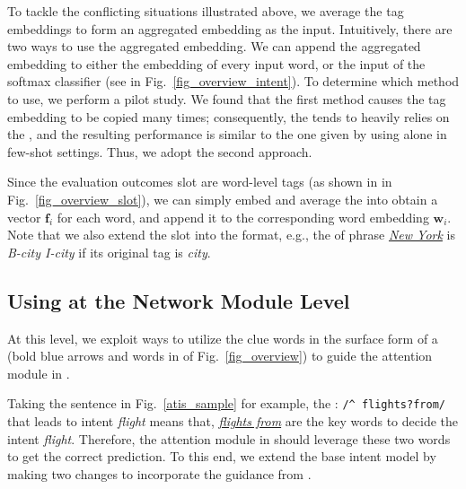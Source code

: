 To tackle the conflicting situations illustrated above, we average the tag embeddings to form an aggregated embedding as the \NN input.
Intuitively, there are two ways to use the aggregated embedding. We can  append the aggregated embedding to either the embedding of every
input word, or the input of the softmax classifier (see  in Fig.~\ref{fig_overview_intent}). To determine which method to use,
we perform a pilot study. We found that the first method causes the tag embedding to be copied many times; consequently, the \NN tends to
heavily relies on the \REtags, and the resulting performance is similar to the one given by using \REs alone in few-shot settings. Thus, we
adopt the second approach.

 Since the evaluation outcomes slot \REs are word-level tags (as shown in  in
Fig.~\ref{fig_overview_slot}), we can simply embed and average the \REtags into obtain a vector $\textbf{f}_i$ for each word, and append it
to the corresponding word embedding $\textbf{w}_i$.
Note that we also extend the slot \REtags into the \BIO format, e.g., the \REtag of phrase \textsl{\underline{New York}} is \emph{B-city
I-city} if its original tag is \emph{city}.

\subsection{Using \REs at the Network Module Level}
\label{interact_with_module} At this level, we exploit ways to utilize the clue words in the surface form of a \RE (bold blue arrows and
words in  of Fig.~\ref{fig_overview}) to guide the attention module in \NNs.


 Taking the sentence in Fig.~\ref{atis_sample} for example, the \RE: {\small\texttt{/\textasciicircum
flights?\:from/} } that leads to intent \emph{flight} means that, \textsl{\underline{flights from}} are the key words to decide the intent
\emph{flight}. Therefore, the attention module in \NNs should leverage these two words to get the correct prediction. To this end, we
extend the base intent model by making two changes to incorporate the guidance from \REs.

